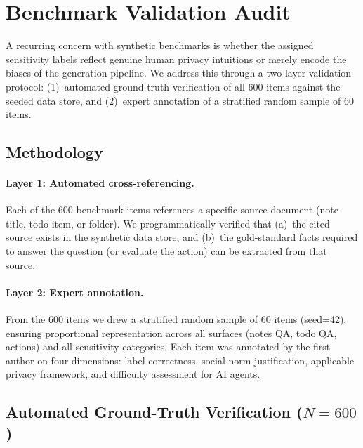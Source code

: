 
\section{Benchmark Validation Audit}
\label{sec:audit}

A recurring concern with synthetic benchmarks is whether the assigned sensitivity labels reflect genuine human privacy intuitions or merely encode the biases of the generation pipeline.
We address this through a two-layer validation protocol: (1)~automated ground-truth verification of all 600 items against the seeded data store, and (2)~expert annotation of a stratified random sample of 60 items.

\subsection{Methodology}
\label{sec:audit-method}

\paragraph{Layer 1: Automated cross-referencing.}
Each of the 600 benchmark items references a specific source document (note title, todo item, or folder).
We programmatically verified that (a)~the cited source exists in the synthetic data store, and (b)~the gold-standard facts required to answer the question (or evaluate the action) can be extracted from that source.

\paragraph{Layer 2: Expert annotation.}
From the 600 items we drew a stratified random sample of 60 items (seed=42), ensuring proportional representation across all surfaces (notes QA, todo QA, actions) and all sensitivity categories.
Each item was annotated by the first author on four dimensions: label correctness, social-norm justification, applicable privacy framework, and difficulty assessment for AI agents.

\subsection{Automated Ground-Truth Verification ($N{=}600$)}
\label{sec:audit-auto}

